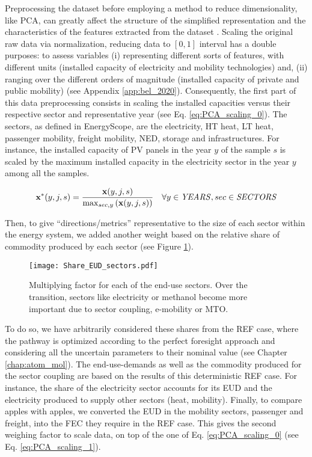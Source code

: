 \noindent
Preprocessing the dataset before employing a method to reduce dimensionality, like \gls{PCA}, can greatly affect the structure of the simplified representation and the characteristics of the features extracted from the dataset \cite{parente2013principal,peerenboom2015dimension}. Scaling the original raw data via normalization, \ie reducing data to $[0, 1]$ interval has a double purposes: to assess variables (i) representing different sorts of features, with different units (\eg installed capacity of electricity and mobility technologies) and, (ii) ranging over the different orders of magnitude (\eg installed capacity of private and public mobility) (see Appendix \ref{app:bel_2020}).  Consequently, the first part of this data preprocessing consists in scaling the installed capacities versus their respective sector and representative year (see Eq. \ref{eq:PCA_scaling_0}). The sectors, as defined in EnergyScope, are the electricity, \gls{HT} heat, \gls{LT} heat, passenger mobility, freight mobility, \gls{NED}, storage and infrastructures. For instance, the installed capacity of \gls{PV} panels in the year $y$ of the sample $s$ is scaled by the maximum installed capacity in the electricity sector in the year $y$ among all the samples.

\begin{equation}
 \label{eq:PCA_scaling_0}
\textbf{x}^{*}(y,j,s)=\frac{\textbf{x}(y,j,s)}{\mathrm{max}_{sec,y}\left(\textbf{x}(y,j,s)\right)}
 \quad \forall y \in \text{\emph{YEARS}}, sec \in \text{\emph{SECTORS}}
\end{equation}

Then, to give ``directions/metrics'' representative to the size of each sector within the energy system, we added another weight based on the relative share of commodity produced by each sector (see Figure \ref{fig:Share_EUD_sectors}). 

\begin{figure}[!htbp]
\centering
\texttt{[image: Share\_EUD\_sectors.pdf]}
\caption{Multiplying factor for each of the end-use sectors. Over the transition, sectors like electricity or methanol become more important due to sector coupling, \eg e-mobility or \gls{MTO}.}
\label{fig:Share_EUD_sectors}
\end{figure}

To do so, we have arbitrarily considered these shares from the REF case, where the pathway is optimized according to the perfect foresight approach and considering all the uncertain parameters to their nominal value (see Chapter \ref{chap:atom_mol}).  The end-use-demands as well as the commodity produced for the sector coupling are based on the results of this deterministic REF case.  For instance, the share of the electricity sector accounts for its \gls{EUD} and the electricity produced to supply other sectors (\eg heat, mobility). Finally, to compare apples with apples, we converted the \gls{EUD} in the mobility sectors, \ie passenger and freight, into the \gls{FEC} they require in the REF case. This gives the second weighing factor to scale data, on top of the one of Eq. \ref{eq:PCA_scaling_0} (see Eq. \ref{eq:PCA_scaling_1}).

